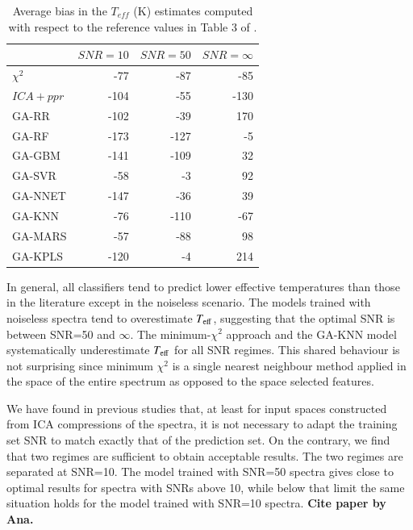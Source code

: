 \begin{table}\centering
{}
\begin{tabular}{@{}lrrr@{}}\toprule
& {$SNR = 10$} & {$SNR = 50$} & {$SNR = \infty$}\\ \midrule
$\chi^2 $            &  -77 &  -87  & -85 \\
$ICA+ppr$            & -104 & -55   & -130 \\
GA-RR                & -102 &  -39  & 170 \\
GA-RF                & -173 & -127  &  -5 \\
GA-GBM               & -141 & -109  &  32 \\
GA-SVR               &  -58  &  -3  &  92 \\
GA-NNET              & -147 &  -36  &  39 \\
GA-KNN               &  -76  &-110  & -67 \\
GA-MARS              &  -57  & -88  &  98 \\
GA-KPLS              & -120 &   -4  & 214 \\
\bottomrule
\end{tabular}
\caption {Average bias in the $T_{eff}$ (K) estimates computed with
  respect to the reference values in Table 3 of \cite{cesetti}.}
\label{tab:model_Tbias} 
\end{table}

In general, all classifiers tend to predict lower effective
temperatures than those in the literature except in the noiseless
scenario. The models trained with noiseless spectra tend to
overestimate $T_{\rm eff}$, suggesting that the optimal SNR is between
SNR=50 and $\infty$. The minimum-$\chi^2$ approach and the GA-KNN
model systematically underestimate $T_{\rm eff}$ for all SNR
regimes. This shared behaviour is not surprising since minimum
$\chi^2$ is a single nearest neighbour method applied in the space of
the entire spectrum as opposed to the space selected features.

We have found in previous studies that, at least for input spaces
constructed from ICA compressions of the spectra, it is not necessary
to adapt the training set SNR to match exactly that of the prediction
set. On the contrary, we find that two regimes are sufficient to
obtain acceptable results. The two regimes are separated at
SNR=10. The model trained with SNR=50 spectra gives close to optimal
results for spectra with SNRs above 10, while below that limit the
same situation holds for the model trained with SNR=10 spectra. {\bf
  Cite paper by Ana.}

